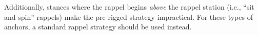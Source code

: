 \documentclass[nonacm,acmtog]{acmart}
\begin{document}
   Additionally, stances where the rappel begins {\em above} the rappel station
   (i.e., ``sit and spin'' rappels) make the pre-rigged strategy impractical.
   For these types of anchors, a standard rappel strategy should be used
   instead.

\begin{comment}
\section{Pre-Rigged Rappels and the Mountaineers}
\label{sec:mountaineers}

  The Mountaineers' climbing classes teach pre-rigged rappels as follows:

  \begin{table}
  \begin{tabular}{|rll|}
    \hline
    \textbf{Branch} & \textbf{Class} & \textbf{Taught?} \\
    \hline\hline
    Everett    & Basic & No \\
               & Intermediate (LOR) & Considering \\
    \hline
    Bellingham & Basic & Demonstrated \\
               & Intermediate & Yes \\
    \hline
    Kitsap & --- & No \\
    \hline
    Olympia & --- & No \\
    \hline
    Seattle & Basic & No \\
            & Intermediate (rock, ice) & No \\
            & Advanced Alpine Rock     & Yes \\
    \hline
    Tacoma  & --  & No \\
    \hline
  \end{tabular}
  \caption{Current curriculum status of pre-rigged rappels in various courses
  at the Mountaineers branches}
  \end{table}
\end{comment}


\begin{comment}
\section{CTAC Endorsement and Recommendation}

  CTAC endorses the use of pre-rigged rappels whenever safe to do and when the
  conditions described in Downsides to Pre-rigging a rappel are not present.
  Furthermore, the CTAC majority opinion---with some dissenting opinions ---is
  that pre-rigging should be the standard operating procedure taught by The
  Mountaineers' climbing classes used on Mountaineers' field trips again under
  safe conditions.
\end{comment}
\end{document}
